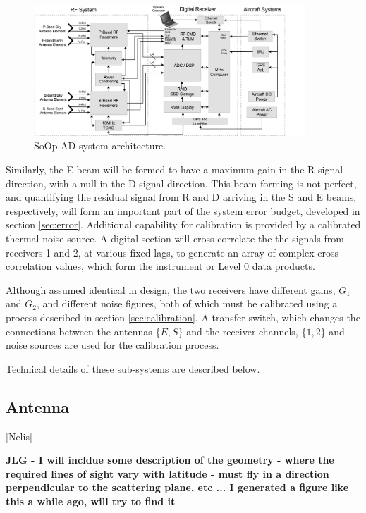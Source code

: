\documentclass[draftcls,onecolumn]{IEEEtran}  %
\begin{document}
\begin{figure}
	\centering
	\includegraphics[width=4in]{pdf/SoOp_System_Architecture_Block_Diagram_04-03-17.png}
	\caption{SoOp-AD system architecture.}
   	\centering
	\label{fig:sysArch}
\end{figure}

Similarly, the E beam will be formed to have a maximum gain in the R signal direction, with a null in the D signal direction.
This beam-forming is not perfect, and quantifying the residual signal from R and D arriving in the S and E beams, respectively, will form an important part of the system error budget, developed in section \ref{sec:error}. 
Additional capability for calibration is provided by a calibrated thermal noise source.
A digital section will cross-correlate the the signals from receivers 1 and 2, at various fixed lags, to generate an array of complex cross-correlation values, which form the instrument or Level 0 data products.


Although assumed identical in design, the two receivers have different gains, $G_1$ and $G_2$, and different noise figures, both of which must be calibrated using a process described in section \ref{sec:calibration}.  
A transfer switch, which changes the connections between the antennas $\{ E, S \}$ and the receiver channels, $\{ 1, 2\}$ and noise sources are used for the calibration process. 


Technical details of these sub-systems are described below. 

\subsection{Antenna}
\label{sec:antenna}
[Nelis]

\bf JLG - I will incldue some description of the geometry - where the required lines of sight vary with latitude - must fly in a direction perpendicular to the scattering plane,  etc ... I generated a figure like this a while ago, will try to find it \rm 
\end{document}
